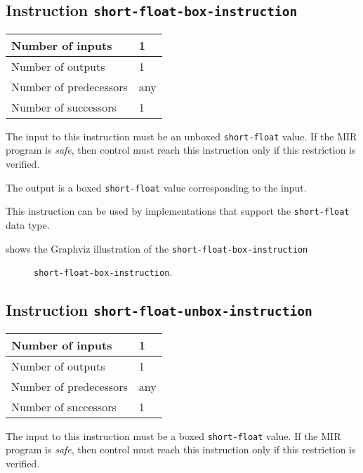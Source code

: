 \subsection{Instruction \texttt{short-float-box-instruction}}
\label{mir-instruction-short-float-box}

\begin{tabular}{|l|l|}
\hline
Number of inputs & 1\\
\hline
Number of outputs & 1\\
\hline
Number of predecessors & any\\
\hline
Number of successors & 1\\
\hline
\end{tabular}

The input to this instruction must be an unboxed \texttt{short-float}
value.  If the MIR program is \emph{safe}, then control must reach
this instruction only if this restriction is verified.

The output is a boxed \texttt{short-float} value corresponding to the
input.

This instruction can be used by implementations that support the
\texttt{short-float} data type.   

 shows the Graphviz illustration of the
\texttt{short-float-box-instruction}

\begin{figure}
\begin{center}
\end{center}
\caption{\label{fig-short-float-box-instruction}
\texttt{short-float-box-instruction}.}
\end{figure}

\subsection{Instruction \texttt{short-float-unbox-instruction}}
\label{mir-instruction-short-float-unbox}

\begin{tabular}{|l|l|}
\hline
Number of inputs & 1\\
\hline
Number of outputs & 1\\
\hline
Number of predecessors & any\\
\hline
Number of successors & 1\\
\hline
\end{tabular}

The input to this instruction must be a boxed \texttt{short-float}
value.  If the MIR program is \emph{safe}, then control must reach
this instruction only if this restriction is verified.

